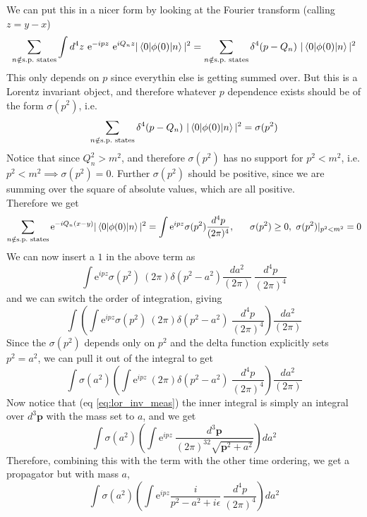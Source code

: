 \documentclass[11pt]{article}
\newcommand{\e}{\mathrm{e}}
\numberwithin{equation}{section}
\begin{document}
We can put this in a nicer form by looking at the Fourier transform (calling \(z=y-x\))
\begin{equation*}
    \sum_{n\notin \text{s.p.\ states}}\int d^4z ~\e^{-ipz}~ \e^{iQ_nz}|\braket{0|\phi(0)|n}|^2 = \sum_{n\notin \text{s.p.\ states}} \delta^4(p-Q_n)~|\braket{0|\phi(0)|n}|^2
\end{equation*}
This only depends on \(p\) since everythin else is getting summed over. But this is a Lorentz invariant object, and therefore whatever \(p\) dependence exists should be of the form \(\sigma(p^2)\), i.e. 
\begin{equation*}
    \sum_{n\notin \text{s.p.\ states}} \delta^4(p-Q_n)~|\braket{0|\phi(0)|n}|^2 = \sigma(p^2)
\end{equation*}
Notice that since \(Q_n^2 > m^2\), and therefore \(\sigma(p^2)\) has no support for \(p^2< m^2\), i.e. \(p^2<m^2 \implies \sigma(p^2) = 0\). Further \(\sigma(p^2)\) should be positive, since we are summing over the square of absolute values, which are all positive.\\
Therefore we get 
\begin{equation*}
    \sum_{n\notin \text{s.p.\ states}}\e^{-iQ_n(x-y)}|\braket{0|\phi(0)|n}|^2 = \int \e^{ipz} \sigma(p^2) \frac{d^4p}{(2\pi)^4}, ~~~~~\sigma(p^2)\ge 0,~\sigma(p^2)|_{p^2<m^2} = 0
\end{equation*}
We can now insert a \(1\) in the above term as
\begin{equation*}
    \int \e^{ipz} \sigma(p^2) ~(2\pi)\delta(p^2-a^2) \frac{da^2}{(2\pi)} ~\frac{d^4p}{(2\pi)^4}
\end{equation*}
and we can switch the order of integration, giving 
\begin{equation*}
    \int \left(\int  \e^{ipz} \sigma(p^2) ~(2\pi)\delta(p^2-a^2) ~\frac{d^4p}{(2\pi)^4}\right)\frac{da^2}{(2\pi)} 
\end{equation*}
Since the \(\sigma(p^2)\) depends only on \(p^2\) and the delta function explicitly sets \(p^2 = a^2\), we can pull it out of the integral to get 
\begin{equation*}
    \int \sigma(a^2) \left(\int  \e^{ipz} ~(2\pi)\delta(p^2-a^2) ~\frac{d^4p}{(2\pi)^4}\right)\frac{da^2}{(2\pi)} 
\end{equation*}
Now notice that (eq \ref{eq:lor_inv_meas}) the inner integral is simply an integral over \(d^3\textbf{p}\) with the mass set to \(a\), and we get 
\begin{equation*}
    \int \sigma(a^2) \left(\int  \e^{ipz} ~\frac{d^3\textbf{p}}{(2\pi)^32\sqrt{\textbf{p}^2 + a^2}}\right)da^2 
\end{equation*}
Therefore, combining this with the term with the other time ordering, we get a propagator but with mass \(a\),
\begin{equation*}
    \int \sigma(a^2) \left(\int  \e^{ipz}\frac{i}{p^2 - a^2 + i\epsilon} ~\frac{d^4p}{(2\pi)^4}\right)da^2
\end{equation*}
\end{document}
